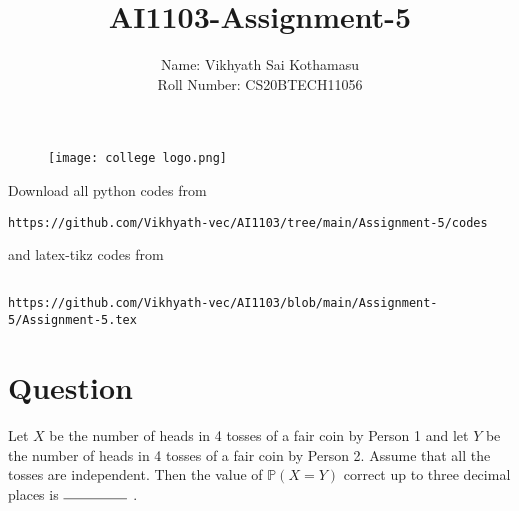 \documentclass[journal,12pt,twocolumn]{IEEEtran}
\begin{document}
\title{AI1103-Assignment-5}
\author{Name: Vikhyath Sai Kothamasu\\Roll Number: CS20BTECH11056}
\maketitle
\newpage
\bigskip
\renewcommand{\thefigure}{\theenumi}
\renewcommand{\thetable}{\theenumi}

\begin{figure} [h]
    \texttt{[image: college logo.png]}
\end{figure}

Download all python codes from 
\begin{lstlisting}
https://github.com/Vikhyath-vec/AI1103/tree/main/Assignment-5/codes
\end{lstlisting}
%
and latex-tikz codes from 
%
\begin{lstlisting}

https://github.com/Vikhyath-vec/AI1103/blob/main/Assignment-5/Assignment-5.tex
\end{lstlisting}
\section*{Question}

Let $X$ be the number of heads in 4 tosses of a fair coin by Person 1 and let $Y$ be the number of heads in 4 tosses of a fair coin by Person 2. Assume that all the tosses are independent. Then the value of $\mathbb{P}(X=Y)$ correct up to three decimal places is $\rule{1.6cm}{0.15mm}$ .
\end{document}
